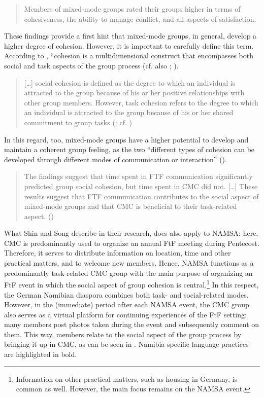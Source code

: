 \documentclass[output=paper]{langsci/langscibook}
\begin{document}
\begin{quote}
Members of mixed-mode groups rated their groups higher in terms of cohesiveness, the ability to manage conflict, and all aspects of satisfaction. \citep[1]{ocker_mediating_2002}
\end{quote}

These findings provide a first hint that mixed-mode groups, in general, develop a higher degree of cohesion. However, it is important to carefully define this term. According to \citet[127]{shin_role_2011},  “cohesion is a multidimensional construct that encompasses both social and task aspects of the group process (cf. also \citealt[276]{brawley_assessing_1987}; \citealt{carron_development_1985}).

\begin{quote}
[…] social cohesion is defined as the degree to which an individual is attracted to the group because of his or her positive relationships with other group members. However, task cohesion refers to the degree to which an individual is attracted to the group because of his or her shared commitment to group tasks (\citealt[127]{shin_role_2011}; cf. \citealt[276]{brawley_assessing_1987})
\end{quote}

In this regard, too, mixed-mode groups have a higher potential to develop and maintain a coherent group feeling, as the two “different types of cohesion can be developed through different modes of communication or interaction” (\citealt[136]{shin_role_2011}). 

\begin{quote}
The findings suggest that time spent in FTF communication significantly predicted group social cohesion, but time spent in CMC did not. […] These results suggest that FTF communication contributes to the social aspect of mixed-mode groups and that CMC is beneficial to their task-related aspect. (\citealt[126]{shin_role_2011})
\end{quote}

What Shin and Song describe in their research, does also apply to NAMSA: here, CMC is predominantly used to organize an annual FtF meeting during Pentecost. Therefore, it serves to distribute information on location, time and other practical matters, and to welcome new members. Hence, NAMSA functions as a predominantly task-related CMC group with the main purpose of organizing an FtF event in which the social aspect of group cohesion is central.\footnote{Information on other practical matters, such as housing in Germany, is common as well. However, the main focus remains on the NAMSA event.} In this respect, the German Namibian diaspora combines both task- and social-related modes. However, in the (immediate) period after each NAMSA event, the CMC group also serves as a virtual platform for continuing experiences of the FtF setting: many members post photos taken during the event and subsequently comment on them. This way, members relate to the social aspect of the group process by bringing it up in CMC, as can be seen in . Namibia-specific language practices are highlighted in bold.
\end{document}
